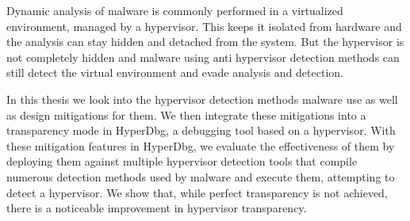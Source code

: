 Dynamic analysis of malware is commonly performed in a virtualized environment, managed by a hypervisor. 
This keeps it isolated from hardware and the analysis can stay hidden and detached from the system. But the hypervisor is not completely hidden and malware using anti hypervisor 
detection methods can still detect the virtual environment and evade analysis and detection. 

In this thesis we look into the hypervisor detection methods malware use as well as design mitigations for them.  
We then integrate these mitigations into a transparency mode in HyperDbg, a debugging tool based on a hypervisor. With these mitigation features in HyperDbg, 
we evaluate the effectiveness of them by deploying them against multiple hypervisor detection tools that compile numerous detection methods used by malware and execute them, 
attempting to detect a hypervisor. We show that, while perfect transparency is not achieved, there is a noticeable improvement in hypervisor transparency.



